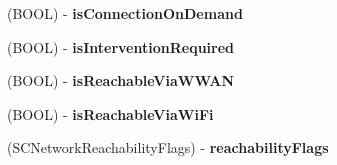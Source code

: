 \begin{DoxyCompactItemize}
\item 
\hypertarget{interface_reachability_af5bea7c2cfd6439a4ff5f0ab0b92e37b}{
(\-B\-O\-O\-L) -\/ {\bfseries is\-Connection\-On\-Demand}}
\label{interface_reachability_af5bea7c2cfd6439a4ff5f0ab0b92e37b}

\item 
\hypertarget{interface_reachability_ad44af2ebf5ffd986dacad06e63362550}{
(\-B\-O\-O\-L) -\/ {\bfseries is\-Intervention\-Required}}
\label{interface_reachability_ad44af2ebf5ffd986dacad06e63362550}

\item 
\hypertarget{interface_reachability_a20011128b407d36659bc78a64cd583f5}{
(\-B\-O\-O\-L) -\/ {\bfseries is\-Reachable\-Via\-W\-W\-A\-N}}
\label{interface_reachability_a20011128b407d36659bc78a64cd583f5}

\item 
\hypertarget{interface_reachability_a994f39db8e47480480ffd7ee81159ecb}{
(\-B\-O\-O\-L) -\/ {\bfseries is\-Reachable\-Via\-Wi\-Fi}}
\label{interface_reachability_a994f39db8e47480480ffd7ee81159ecb}

\item 
\hypertarget{interface_reachability_ac9080e40006cd8c82431a668ec8bfe18}{
(\-S\-C\-Network\-Reachability\-Flags) -\/ {\bfseries reachability\-Flags}}
\label{interface_reachability_ac9080e40006cd8c82431a668ec8bfe18}

\end{DoxyCompactItemize}
